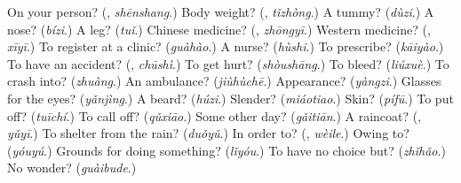 \begin{tcolorbox}[breakable,colback=teal!4,colframe=teal!35!black,title={Before you move on}]
On your person? (\textbf{}, \emph{shēnshang}.) Body weight? (\textbf{}, \emph{tǐzhòng}.) A tummy? (\emph{dùzi}.) A nose? (\emph{bízi}.) A leg? (\emph{tuǐ}.) Chinese medicine? (\textbf{}, \emph{zhōngyī}.) Western medicine? (\textbf{}, \emph{xīyī}.) To register at a clinic? (\emph{guàhào}.) A nurse? (\emph{hùshi}.) To prescribe? (\emph{kāiyào}.) To have an accident? (\textbf{}, \emph{chūshì}.) To get hurt? (\emph{shòushāng}.) To bleed? (\emph{liúxuè}.) To crash into? (\emph{zhuàng}.) An ambulance? (\emph{jiùhùchē}.) Appearance? (\emph{yàngzi}.) Glasses for the eyes? (\emph{yǎnjìng}.) A beard? (\emph{húzi}.) Slender? (\emph{miáotiao}.) Skin? (\emph{pífū}.) To put off? (\emph{tuīchí}.) To call off? (\emph{qǔxiāo}.) Some other day? (\emph{gǎitiān}.) A raincoat? (\textbf{}, \emph{yǔyī}.) To shelter from the rain? (\emph{duǒyǔ}.) In order to? (\textbf{}, \emph{wèile}.) Owing to? (\emph{yóuyú}.) Grounds for doing something? (\emph{lǐyóu}.) To have no choice but? (\emph{zhǐhǎo}.) No wonder? (\emph{guàibude}.)
\end{tcolorbox}
